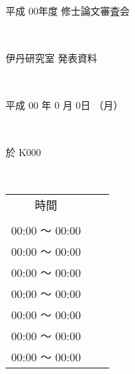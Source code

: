 
\pagestyle{empty}

 ~\vfill
 \begin{center}
  {\Huge 平成 00年度 修士論文審査会}
 \end{center}

 ~\vfill

\begin{center}
  {\huge 伊丹研究室 発表資料}
\end{center}

 ~\vfill

\begin{center}
  {\huge 平成 00 年 0 月 0日 （月）}
\end{center}

 ~\vfill

\begin{center}
  {\huge 於 K000}
\end{center}

  ~\vfill

\begin{center}
\hspace*{-2zw}  
 \begin{tabular}{ccc}
  {\LARGE 時間} &\hspace*{2zw}{\LARGE 学籍番号}&\multicolumn{1}{l}{\hspace*{5zw}{\LARGE 氏名}}\\
  &&\\
  {\LARGE 00:00 〜 00:00}&\hspace*{2zw}{\LARGE 8100000}&\multicolumn{1}{l}{\hspace*{2zw}{\LARGE 氏名1}}\\
  {\LARGE 00:00 〜 00:00}&\hspace*{2zw}{\LARGE 8100001}&\multicolumn{1}{l}{\hspace*{2zw}{\LARGE 氏名2}}\\
  {\LARGE 00:00 〜 00:00}&\hspace*{2zw}{\LARGE 8100002}&\multicolumn{1}{l}{\hspace*{2zw}{\LARGE 氏名3}}\\
  {\LARGE 00:00 〜 00:00}&\hspace*{2zw}{\LARGE 8100003}&\multicolumn{1}{l}{\hspace*{2zw}{\LARGE 氏名4}}\\
  {\LARGE 00:00 〜 00:00}&\hspace*{2zw}{\LARGE 8100004}&\multicolumn{1}{l}{\hspace*{2zw}{\LARGE 氏名5}}\\
  {\LARGE 00:00 〜 00:00}&\hspace*{2zw}{\LARGE 8100005}&\multicolumn{1}{l}{\hspace*{2zw}{\LARGE 氏名6}}\\
  {\LARGE 00:00 〜 00:00}&\hspace*{2zw}{\LARGE 8100006}&\multicolumn{1}{l}{\hspace*{2zw}{\LARGE 氏名6 (外部研究室)}}\\
 \end{tabular}
\end{center}


